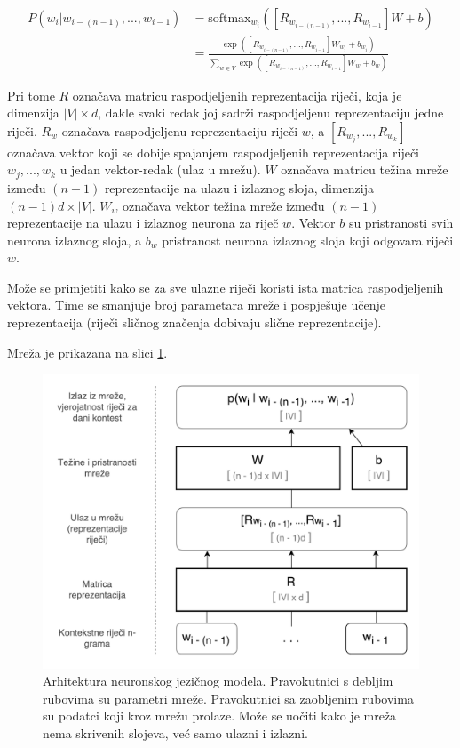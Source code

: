 \documentclass[times, utf8, diplomski, numeric]{fer}
\begin{document}
\begin{equation}
\label{eq:lnnet}
\begin{split}
P(w_i | w_{i - (n - 1)}, ... , w_{i - 1}) 
  & = \text{softmax}_{w_i}\left(\left[R_{w_{i - (n - 1)}}, ..., R_{w_{i - 1}}\right] W + b\right) \\[1ex]
  & = \frac{\exp\left(\left[R_{w_{i - (n - 1)}}, ... , R_{w_{i - 1}}\right] W_{w_i} + b_{w_i}\right)}
           {\sum_{w \in V} \exp\left(\left[R_{w_{i - (n - 1)}}, ... , R_{w_{i - 1}}\right] W_{w} + b_{w}\right)}
\end{split}
\end{equation}

Pri tome $R$ označava matricu raspodjeljenih reprezentacija riječi, koja je dimenzija $|V| \times d$, dakle svaki redak joj sadrži raspodjeljenu reprezentaciju jedne riječi. $R_w$ označava raspodjeljenu reprezentaciju riječi $w$, a $\left[R_{w_j}, ..., R_{w_k}\right]$ označava vektor koji se dobije spajanjem raspodjeljenih reprezentacija riječi $w_j, ..., w_k$ u jedan vektor-redak (ulaz u mrežu). $W$ označava matricu težina  mreže između $(n - 1)$ reprezentacije na ulazu i izlaznog sloja, dimenzija $(n - 1) d \times |V|$. $W_w$ označava vektor težina mreže između $(n - 1)$ reprezentacije na ulazu i izlaznog neurona za riječ $w$. Vektor $b$ su pristranosti  svih neurona izlaznog sloja, a $b_w$ pristranost neurona izlaznog sloja koji odgovara riječi $w$.

Može se primjetiti kako se za sve ulazne riječi koristi ista matrica raspodjeljenih vektora. Time se smanjuje broj parametara mreže i pospješuje učenje reprezentacija (riječi sličnog značenja dobivaju slične reprezentacije).

Mreža je prikazana na slici \ref{fig:nnet}.

\begin{figure}[!htb]
\centering
\includegraphics[scale=0.5]{fig/nnet.pdf}
\caption{Arhitektura neuronskog jezičnog modela. Pravokutnici s debljim rubovima su parametri mreže. Pravokutnici sa zaobljenim rubovima su podatci koji kroz mrežu prolaze. Može se uočiti kako je mreža nema skrivenih slojeva, već samo ulazni i izlazni.}
\label{fig:nnet}
\end{figure}
\end{document}
